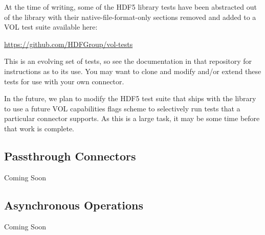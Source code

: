 At the time of writing, some of the HDF5 library tests have been abstracted
out of the library with their native-file-format-only sections removed and
added to a VOL test suite available here:

\quad \quad \url{https://github.com/HDFGroup/vol-tests}

This is an evolving set of tests, so see the documentation in that repository
for instructions as to its use. You may want to clone and modify and/or
extend these tests for use with your own connector.

In the future, we plan to modify the HDF5 test suite that ships with the
library to use a future VOL capabilities flags scheme to selectively run
tests that a particular connector supports. As this is a large task, it may be
some time before that work is complete.

\subsection{Passthrough Connectors}

Coming Soon

\subsection{Asynchronous Operations}

Coming Soon


